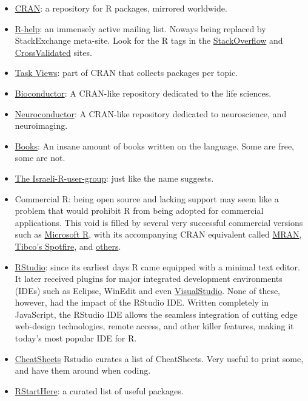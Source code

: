 \documentclass[]{book}
\theoremstyle{definition}
\theoremstyle{definition}
\theoremstyle{definition}
\theoremstyle{remark}
\begin{document}
\begin{itemize}
\item
  \href{https://cran.r-project.org/}{CRAN}: a repository for R packages,
  mirrored worldwide.
\item
  \href{https://www.r-project.org/mail.html}{R-help}: an immensely
  active mailing list. Noways being replaced by StackExchange meta-site.
  Look for the R tags in the
  \href{http://stackoverflow.com/}{StackOverflow} and
  \href{http://stats.stackexchange.com/}{CrossValidated} sites.
\item
  \href{https://cran.r-project.org/web/views/}{Task Views}: part of CRAN
  that collects packages per topic.
\item
  \href{https://www.bioconductor.org/}{Bioconductor}: A CRAN-like
  repository dedicated to the life sciences.
\item
  \href{https://www.neuroconductor.org/}{Neuroconductor}: A CRAN-like
  repository dedicated to neuroscience, and neuroimaging.
\item
  \href{https://www.r-project.org/doc/bib/R-books.html}{Books}: An
  insane amount of books written on the language. Some are free, some
  are not.
\item
  \href{https://groups.google.com/forum/\#!forum/israel-r-user-group}{The
  Israeli-R-user-group}: just like the name suggests.
\item
  Commercial R: being open source and lacking support may seem like a
  problem that would prohibit R from being adopted for commercial
  applications. This void is filled by several very successful
  commercial versions such as
  \href{https://mran.microsoft.com/open/}{Microsoft R}, with its
  accompanying CRAN equivalent called
  \href{https://mran.microsoft.com/}{MRAN},
  \href{http://spotfire.tibco.com/discover-spotfire/what-does-spotfire-do/predictive-analytics/tibco-enterprise-runtime-for-r-terr}{Tibco's
  Spotfire}, and
  \href{https://en.wikipedia.org/wiki/R_(programming_language)\#Commercial_support_for_R}{others}.
\item
  \href{https://www.rstudio.com/products/rstudio/download-server/}{RStudio}:
  since its earliest days R came equipped with a minimal text editor. It
  later received plugins for major integrated development environments
  (IDEs) such as Eclipse, WinEdit and even
  \href{https://www.visualstudio.com/vs/rtvs/}{VisualStudio}. None of
  these, however, had the impact of the RStudio IDE. Written completely
  in JavaScript, the RStudio IDE allows the seamless integration of
  cutting edge web-design technologies, remote access, and other killer
  features, making it today's most popular IDE for R.
\item
  \href{https://www.rstudio.com/resources/cheatsheets/}{CheatSheets}
  Rstudio curates a list of CheatSheets. Very useful to print some, and
  have them around when coding.
\item
  \href{https://github.com/rstudio/RStartHere/blob/master/README.md\#import}{RStartHere}:
  a curated list of useful packages.
\end{itemize}
\end{document}
